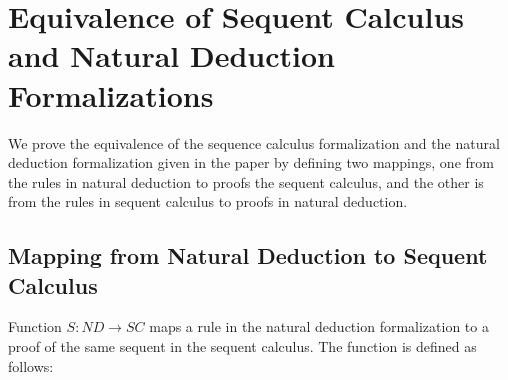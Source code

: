 
\section{Equivalence of Sequent Calculus and Natural Deduction Formalizations}
\label{app:sc-nd-equiv}

We prove the equivalence of the sequence calculus formalization and the
natural deduction formalization given in the paper by defining two
mappings, one from the rules in natural deduction to proofs the sequent
calculus, and the other is from the rules in sequent calculus to proofs in
natural deduction.



\subsection{Mapping from Natural Deduction to Sequent Calculus}

Function $S:\mathit{ND}\rightarrow\mathit{SC}$ maps a rule in the natural
deduction formalization to a proof of the same sequent in the sequent
calculus. The function is defined as follows:


